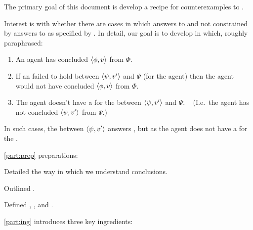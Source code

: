 \begin{note}
  The primary goal of this document is develop a recipe for counterexamples to \issueConstraint{}.

  Interest is with whether there are cases in which answers to \qWhyV{} and not constrained by answers to \qHowV{} as specified by \issueConstraint{}.
  In detail, our goal is to develop  in which, roughly paraphrased:

  \begin{enumerate}
  \item
    An agent has concluded \(\langle \phi, v \rangle\) from \(\Phi\).
  \item
    If an \ros{} failed to hold between \(\langle \psi, v' \rangle\) and \(\Psi\) (for the agent) then the agent would not have concluded \(\langle \phi, v \rangle\) from \(\Phi\).
  \item
    The agent doesn't have a \wit{} for the \ros{} between \(\langle \psi, v' \rangle\) and \(\Psi\).\newline
    \mbox{ }\hfill%
    (I.e.\ the agent has not concluded \(\langle \psi, v' \rangle\) from \(\Psi\).)
  \end{enumerate}

  In such cases, the \ros{} between \(\langle \psi, v' \rangle\) answers \qWhyV{}, but as the agent does not have a \wit{} for the \ros{}.
\end{note}

\begin{note}
  \autoref{part:prep} preparations:

  \begin{TOCEnum}
  \item

    Detailed the way in which we understand conclusions.
  \item

    Outlined .
  \item

    Defined \qWhyV{}, \qHowV{}, and \issueConstraint{}.
  \end{TOCEnum}
\end{note}

\begin{note}
  \autoref{part:ing} introduces three key ingredients:

  \begin{TOCEnum}
  \item
  \item
  \item
  \end{TOCEnum}

\end{note}

